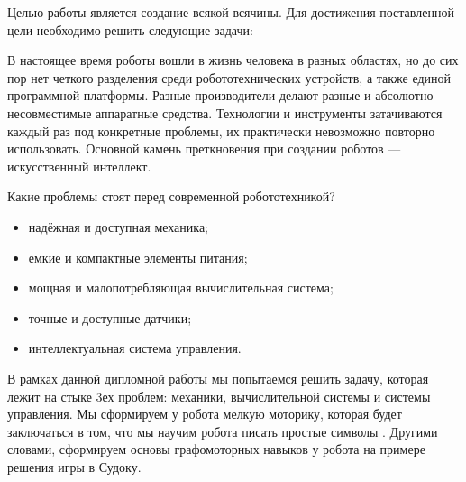 \Introduction

Целью работы является создание всякой всячины. Для достижения поставленной цели необходимо решить следующие задачи:

В настоящее время роботы вошли в жизнь человека в разных областях, но до сих пор нет четкого разделения среди робототехнических устройств, а также единой программной платформы. Разные производители делают разные и абсолютно несовместимые аппаратные средства. Технологии и инструменты затачиваются каждый раз под конкретные проблемы, их практически невозможно повторно использовать. Основной камень преткновения при создании роботов — искусственный интеллект. 

Какие проблемы стоят перед современной робототехникой?

\begin{itemize}
\item надёжная и доступная механика;
\item емкие и компактные элементы питания;
\item мощная и малопотребляющая вычислительная система;
\item точные и доступные датчики;
\item интеллектуальная система управления.
\end{itemize}

В рамках данной дипломной работы мы попытаемся решить задачу, которая лежит на стыке 3ех проблем: механики, вычислительной системы и системы управления.
Мы сформируем у робота мелкую моторику, которая будет заключаться в том, что мы научим робота писать простые символы . Другими словами, сформируем основы графомоторных навыков у робота на примере решения игры в Судоку.
